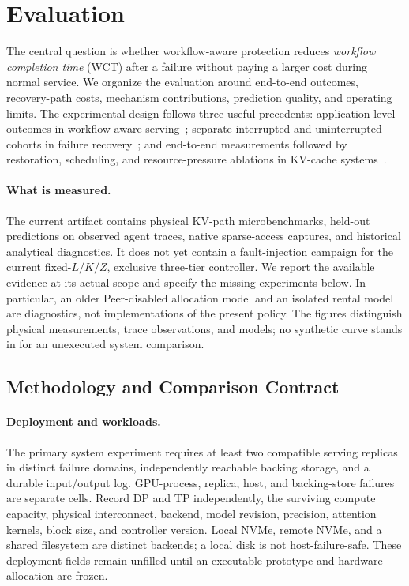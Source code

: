 \section{Evaluation}
\label{sec:evaluation}

The central question is whether workflow-aware protection reduces
\emph{workflow completion time} (WCT) after a failure without paying a
larger cost during normal service. We organize the evaluation around
end-to-end outcomes, recovery-path costs, mechanism contributions,
prediction quality, and operating limits. The experimental design follows
three useful precedents: application-level outcomes in workflow-aware
serving~\cite{lin2024parrot,ni2026topas}; separate interrupted and
uninterrupted cohorts in failure recovery~\cite{cao2026lumen}; and
end-to-end measurements followed by restoration, scheduling, and
resource-pressure ablations in KV-cache systems~\cite{gao2025hcache,qin2025mooncake}.

\paragraph{What is measured.}
The current artifact contains physical KV-path microbenchmarks,
held-out predictions on observed agent traces, native sparse-access
captures, and historical analytical diagnostics. It does not yet contain
a fault-injection campaign for the current fixed-$L/K/Z$, exclusive
three-tier controller. We report the available evidence at its actual
scope and specify the missing experiments below. In particular, an older
Peer-disabled allocation model and an isolated rental model are
diagnostics, not implementations of the present policy. The figures
distinguish physical measurements, trace observations, and models; no
synthetic curve stands in for an unexecuted system comparison.

\subsection{Methodology and Comparison Contract}
\label{sec:eval-method}

\paragraph{Deployment and workloads.}
The primary system experiment requires at least two compatible serving
replicas in distinct failure domains, independently reachable backing
storage, and a durable input/output log. GPU-process, replica, host, and
backing-store failures are separate cells. Record DP and TP independently,
the surviving compute capacity, physical interconnect, backend, model
revision, precision, attention kernels, block size, and controller version.
Local NVMe, remote NVMe, and a shared filesystem are distinct backends;
a local disk is not host-failure-safe. These deployment fields remain
unfilled until an executable prototype and hardware allocation are frozen.

